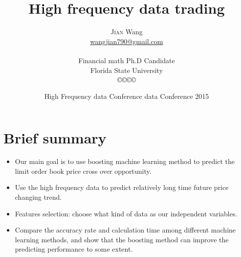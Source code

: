 \documentclass[xcolor={x11names,svgnames,dvipsnames}]{beamer}
\author[\textsc{Jian} Wang]{\textsc{Jian} Wang\\[1ex]%
{\small\url{wangjian790@gmail.com}\\[-.5ex]\url{}}\\
{\small{Financial math Ph.D Candidate}}\\
{\small{Florida State University}}\\
[0.8ex]\copyright\copyright\copyright\copyright} %
\title{High frequency data trading}
\date[\textsc{HFC} 2015]{High Frequency data Conference data Conference 2015 }%
\begin{document}
\begin{frame}
\maketitle
\end{frame}



\section{Brief summary}
\begin{frame}
\begin{itemize}
	\item Our main goal is to use boosting machine learning method to predict the limit order book price \alert{cross over} opportunity.  	
	\item Use the high frequency data to predict relatively \alert{long time} future price changing trend.
     \item Features selection: choose what kind of data as our independent variables.  
   	\item Compare the accuracy rate and calculation time  among different machine learning methods, and show that the boosting method can improve the predicting performance to some extent.  	
\end{itemize}
\end{frame}
\end{document}
